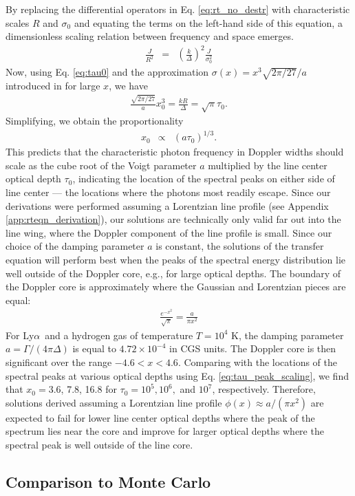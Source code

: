 \documentclass{aastex63}
\newcommand{\be}{\begin{eqnarray}}
\newcommand{\ee}{\end{eqnarray}}
\newcommand\lya{Ly$\alpha$\ }
\begin{document}
By replacing the differential operators in Eq. \ref{eq:rt_no_destr} with characteristic scales $R$ and $\sigma_0$ and equating the terms on the left-hand side of this equation, a dimensionless scaling relation between frequency and space emerges.
\be
\frac{J}{R^2} &=& \left(\frac{k}{\Delta}\right)^2 \frac{J}{\sigma_0^2}
\ee
Now, using Eq. \ref{eq:tau0} and the approximation $\sigma(x)=x^3\sqrt{2\pi/27}/a$ introduced in \cite{1973MNRAS.162...43H} for large $x$, we have
\be
\frac{\sqrt{2\pi/27}}{a}x_0^3 = \frac{kR}{\Delta} = \sqrt{\pi} \tau_0.
\ee
Simplifying, we obtain the proportionality
\be \label{eq:tau_peak_scaling}
x_0 &\propto& \left(a\tau_0\right)^{1/3}.
\ee
This predicts that the characteristic photon frequency in Doppler widths should scale as the cube root of the Voigt parameter $a$ multiplied by the line center optical depth $\tau_0$, indicating the location of the spectral peaks on either side of line center --- the locations where the photons most readily escape. Since our derivations were performed assuming a Lorentzian line profile (see Appendix \ref{app:rteqn_derivation}), our solutions are technically only valid far out into the line wing, where the Doppler component of the line profile is small. Since our choice of the damping parameter $a$ is constant, the solutions of the transfer equation will perform best when the peaks of the spectral energy distribution lie well outside of the Doppler core, e.g., for large optical depths. The boundary of the Doppler core is approximately where the Gaussian and Lorentzian pieces are equal:
\be
\frac{e^{-x^2}}{\sqrt{\pi}} = \frac{a}{\pi x^2}
\ee
For \lya and a hydrogen gas of temperature $T=10^4$ K, the damping parameter $a = \Gamma / (4\pi\Delta)$ is equal to $4.72\times 10^{-4}$ in CGS units. The Doppler core is then significant over the range $-4.6 < x < 4.6$. Comparing with the locations of the spectral peaks at various optical depths using Eq. \ref{eq:tau_peak_scaling}, we find that $x_0=$3.6, 7.8, 16.8 for $\tau_0=10^5, 10^6,$ and $10^7$, respectively. Therefore, solutions derived assuming a Lorentzian line profile $\phi(x) \approx a/(\pi x^2)$ are expected to fail for lower line center optical depths where the peak of the spectrum lies near the core and improve for larger optical depths where the spectral peak is well outside of the line core.
\subsection{Comparison to Monte Carlo}

\end{document}
